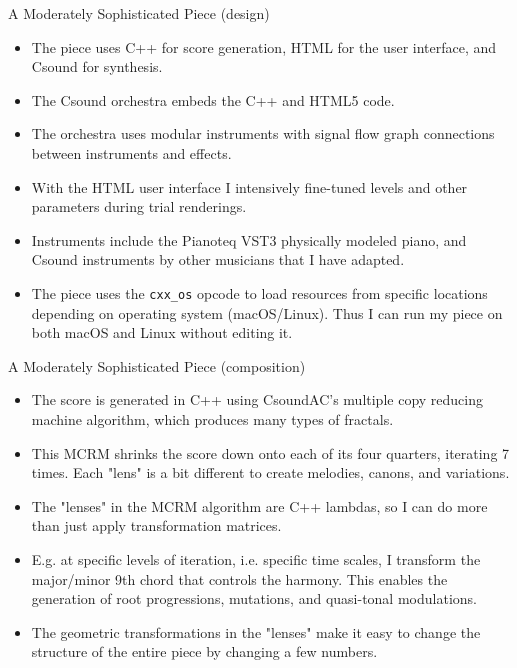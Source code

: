 \documentclass{beamer}
\begin{document}
\begin{frame}{A Moderately Sophisticated Piece (design)}
\begin{itemize}
\item The piece uses C++ for score generation, HTML for the user interface, and Csound for synthesis.
\item The Csound orchestra embeds the C++ and HTML5 code.
\item The orchestra uses modular instruments with signal flow graph connections between instruments and effects.
\item With the HTML user interface I intensively fine-tuned levels and other parameters during trial renderings.
\item Instruments include the Pianoteq VST3 physically modeled piano, and Csound instruments by other musicians that I have adapted.
\item The piece uses the \texttt{cxx\_os} opcode to load resources from specific locations depending on operating system (macOS/Linux). Thus I can run my piece on both macOS and Linux without editing it.
\end{itemize}
\end{frame}

\begin{frame}{A Moderately Sophisticated Piece (composition)}
\begin{itemize}
\item The score is generated in C++ using CsoundAC's multiple copy reducing machine algorithm, which produces many types of fractals.
\item This MCRM shrinks the score down onto each of its four quarters, iterating 7 times. Each "lens" is a bit different to create melodies, canons, and variations.
\item The "lenses" in the MCRM algorithm are C++ lambdas, so I can do more than just apply transformation matrices.
\item E.g. at specific levels of iteration, i.e.  specific time scales, I transform the major/minor 9th chord that controls the harmony. This enables the generation of root progressions, mutations, and quasi-tonal modulations.
\item The geometric transformations in the "lenses" make it easy to change the structure of the entire piece by changing a few numbers.
\end{itemize}
\end{frame}
\end{document}

